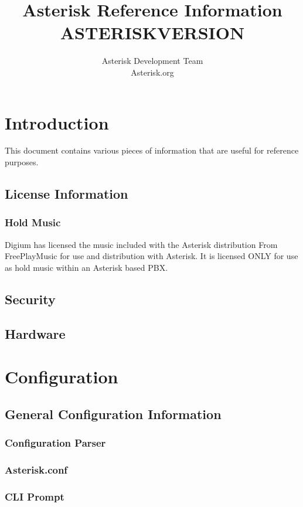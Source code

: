\documentclass[12pt,a4]{report}
\author{Asterisk Development Team \\ Asterisk.org}
\title{Asterisk Reference Information \\ ASTERISKVERSION}
\begin{document}
\maketitle

\tableofcontents

\chapter{Introduction}

This document contains various pieces of information that are useful for
reference purposes.

  \section{License Information}
  
     \subsection{Hold Music}
       Digium has licensed the music included with
       the Asterisk distribution From FreePlayMusic
       for use and distribution with Asterisk.  It
       is licensed ONLY for use as hold music within
       an Asterisk based PBX.
  \section{Security}
  
  \section{Hardware}
  

\chapter{Configuration}
  \section{General Configuration Information}
    \subsection{Configuration Parser}
    
    \subsection{Asterisk.conf}
    
    \subsection{CLI Prompt}
    
\end{document}
